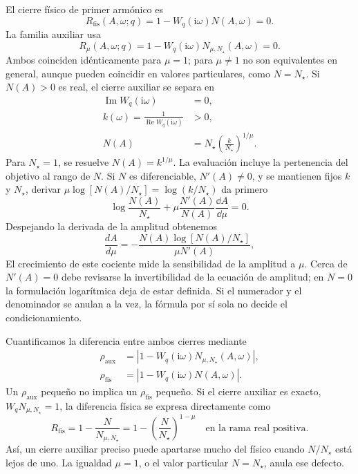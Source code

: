 El cierre físico de primer armónico es
\begin{equation}
 R_{\mathrm{fis}}(A,\omega;q)
 =1-W_q(\mathrm i\omega)N(A,\omega)=0.
 \label{eq:machado-physical-closure}
\end{equation}
La familia auxiliar usa
\begin{equation}
 R_{\mu}(A,\omega;q)
 =1-W_q(\mathrm i\omega)N_{\mu,N_\star}(A,\omega)=0.
 \label{eq:machado-aux-closure}
\end{equation}
Ambos coinciden idénticamente para \(\mu=1\); para \(\mu\ne1\) no
son equivalentes en general, aunque pueden coincidir en valores particulares,
como \(N=N_\star\). Si \(N(A)>0\) es
real, el cierre auxiliar se separa en
\begin{align}
 \operatorname{Im}W_q(\mathrm i\omega)&=0,
 \label{eq:machado-frequency}\\
 k(\omega)=\frac{1}{\operatorname{Re}W_q(\mathrm i\omega)}&>0,
 \label{eq:machado-gain}\\
 N(A)&=N_\star\left(\frac{k}{N_\star}\right)^{1/\mu}.
 \label{eq:machado-amplitude}
\end{align}
Para \(N_\star=1\), se resuelve \(N(A)=k^{1/\mu}\). La evaluación incluye la
pertenencia del objetivo al rango de \(N\). Si \(N\) es diferenciable,
\(N'(A)\ne0\), y se mantienen fijos \(k\) y \(N_\star\), derivar
\(\mu\log[N(A)/N_\star]=\log(k/N_\star)\) da primero
\[
 \log\frac{N(A)}{N_\star}
 +\mu\frac{N'(A)}{N(A)}\frac{\dd A}{\dd\mu}=0.
\]
Despejando la derivada de la amplitud obtenemos
\begin{equation}
 \frac{dA}{d\mu}
 =-\frac{N(A)\log[N(A)/N_\star]}{\mu N'(A)},
 \label{eq:machado-sensitivity}
\end{equation}
El crecimiento de este cociente mide la sensibilidad de la amplitud a
\(\mu\). Cerca de \(N'(A)=0\) debe revisarse la invertibilidad de la
ecuación de amplitud; en \(N=0\) la formulación logarítmica deja de
estar definida. Si el numerador y el denominador se anulan a la vez,
la fórmula por sí sola no decide el condicionamiento.

Cuantificamos la diferencia entre ambos cierres mediante
\begin{align}
 \rho_{\mathrm{aux}}
 &=\left|1-W_q(\mathrm i\omega)N_{\mu,N_\star}(A,\omega)\right|,
 \label{eq:machado-rho-aux}\\
 \rho_{\mathrm{fis}}
 &=\left|1-W_q(\mathrm i\omega)N(A,\omega)\right|.
 \label{eq:machado-rho-phys}
\end{align}
Un \(\rho_{\mathrm{aux}}\) pequeño no implica un \(\rho_{\mathrm{fis}}\)
pequeño. Si el cierre auxiliar es exacto, \(W_qN_{\mu,N_\star}=1\),
la diferencia física se expresa directamente como
\begin{equation}
 R_{\mathrm{fis}}
 =1-\frac{N}{N_{\mu,N_\star}}
 =1-\left(\frac{N}{N_\star}\right)^{1-\mu}
 \quad\text{en la rama real positiva}.
 \label{eq:machado-defecto-fisico-en-raiz-auxiliar}
\end{equation}
Así, un cierre auxiliar preciso puede apartarse mucho del físico cuando
\(N/N_\star\) está lejos de uno. La igualdad \(\mu=1\), o el valor
particular \(N=N_\star\), anula ese defecto.

